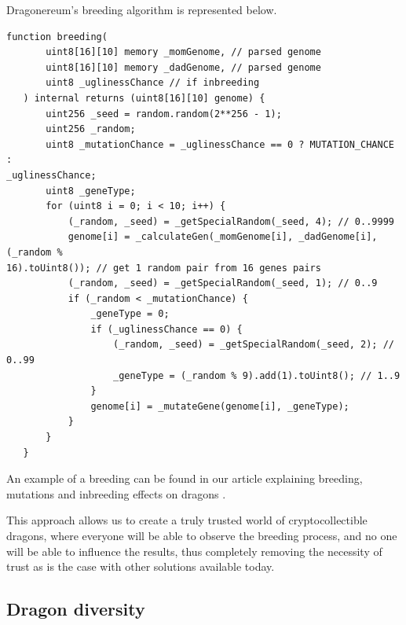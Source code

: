 \documentclass[12pt]{article}
\begin{document}
Dragonereum’s breeding algorithm is represented below.\par

\begin{footnotesize}
\begin{verbatim}
function breeding(
       uint8[16][10] memory _momGenome, // parsed genome
       uint8[16][10] memory _dadGenome, // parsed genome
       uint8 _uglinessChance // if inbreeding
   ) internal returns (uint8[16][10] genome) {
       uint256 _seed = random.random(2**256 - 1);
       uint256 _random;
       uint8 _mutationChance = _uglinessChance == 0 ? MUTATION_CHANCE :
_uglinessChance;
       uint8 _geneType;
       for (uint8 i = 0; i < 10; i++) {
           (_random, _seed) = _getSpecialRandom(_seed, 4); // 0..9999
           genome[i] = _calculateGen(_momGenome[i], _dadGenome[i], (_random % 
16).toUint8()); // get 1 random pair from 16 genes pairs
           (_random, _seed) = _getSpecialRandom(_seed, 1); // 0..9
           if (_random < _mutationChance) {
               _geneType = 0;
               if (_uglinessChance == 0) {
                   (_random, _seed) = _getSpecialRandom(_seed, 2); // 0..99
                   _geneType = (_random % 9).add(1).toUint8(); // 1..9
               }
               genome[i] = _mutateGene(genome[i], _geneType);
           }
       }
   }
\end{verbatim}
\end{footnotesize}

An example of a breeding can be found in our article explaining breeding, mutations and inbreeding effects on dragons \cite{Dragonereum_2018_Mar_26}.\par 

This approach allows us to create a truly trusted world of cryptocollectible dragons, where everyone will be able to observe the breeding process, and no one will be able to influence the results, thus completely removing the necessity of trust as is the case with other solutions available today.

\vspace{\baselineskip}\subsection{Dragon diversity }
\label{Dragon diversity}   
\end{document}
